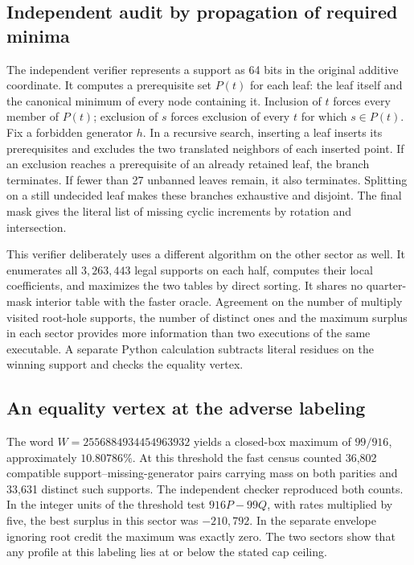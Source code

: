 \subsection{Independent audit by propagation of required minima}

The independent verifier represents a support as 64 bits in the original additive coordinate. It computes a prerequisite set \(P(t)\) for each leaf: the leaf itself and the canonical minimum of every node containing it. Inclusion of \(t\) forces every member of \(P(t)\); exclusion of \(s\) forces exclusion of every \(t\) for which \(s\in P(t)\). Fix a forbidden generator \(h\). In a recursive search, inserting a leaf inserts its prerequisites and excludes the two translated neighbors of each inserted point. If an exclusion reaches a prerequisite of an already retained leaf, the branch terminates. If fewer than 27 unbanned leaves remain, it also terminates. Splitting on a still undecided leaf makes these branches exhaustive and disjoint. The final mask gives the literal list of missing cyclic increments by rotation and intersection.

This verifier deliberately uses a different algorithm on the other sector as well. It enumerates all \(3{,}263{,}443\) legal supports on each half, computes their local coefficients, and maximizes the two tables by direct sorting. It shares no quarter-mask interior table with the faster oracle. Agreement on the number of multiply visited root-hole supports, the number of distinct ones and the maximum surplus in each sector provides more information than two executions of the same executable. A separate Python calculation subtracts literal residues on the winning support and checks the equality vertex.

\subsection{An equality vertex at the adverse labeling}

The word \(W=2556884934454963932\) yields a closed-box maximum of \(99/916\), approximately \(10.80786\%\). At this threshold the fast census counted 36,802 compatible support--missing-generator pairs carrying mass on both parities and 33,631 distinct such supports. The independent checker reproduced both counts. In the integer units of the threshold test \(916P-99Q\), with rates multiplied by five, the best surplus in this sector was \(-210{,}792\). In the separate envelope ignoring root credit the maximum was exactly zero. The two sectors show that any profile at this labeling lies at or below the stated cap ceiling.

